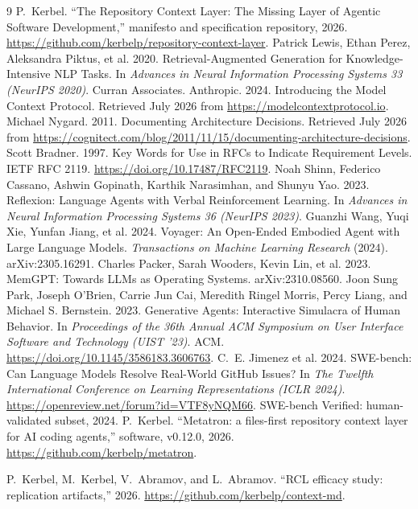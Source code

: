 \documentclass[sigconf,review]{acmart}
\newcommand{\artifact}{\url{https://github.com/kerbelp/context-md}}
\begin{document}
\begingroup\small\vspace{-2pt}
\begin{thebibliography}{9}
 P.~Kerbel. ``The Repository Context Layer: The Missing Layer of Agentic Software Development,'' manifesto and specification repository, 2026. \url{https://github.com/kerbelp/repository-context-layer}.
 Patrick Lewis, Ethan Perez, Aleksandra Piktus, et al. 2020. Retrieval-Augmented Generation for Knowledge-Intensive NLP Tasks. In \emph{Advances in Neural Information Processing Systems 33 (NeurIPS 2020)}. Curran Associates.
 Anthropic. 2024. Introducing the Model Context Protocol. Retrieved July 2026 from \url{https://modelcontextprotocol.io}.
 Michael Nygard. 2011. Documenting Architecture Decisions. Retrieved July 2026 from \url{https://cognitect.com/blog/2011/11/15/documenting-architecture-decisions}.
 Scott Bradner. 1997. Key Words for Use in RFCs to Indicate Requirement Levels. IETF RFC 2119. \url{https://doi.org/10.17487/RFC2119}.
 Noah Shinn, Federico Cassano, Ashwin Gopinath, Karthik Narasimhan, and Shunyu Yao. 2023. Reflexion: Language Agents with Verbal Reinforcement Learning. In \emph{Advances in Neural Information Processing Systems 36 (NeurIPS 2023)}.
 Guanzhi Wang, Yuqi Xie, Yunfan Jiang, et al. 2024. Voyager: An Open-Ended Embodied Agent with Large Language Models. \emph{Transactions on Machine Learning Research} (2024). arXiv:2305.16291.
 Charles Packer, Sarah Wooders, Kevin Lin, et al. 2023. MemGPT: Towards LLMs as Operating Systems. arXiv:2310.08560.
 Joon Sung Park, Joseph O'Brien, Carrie Jun Cai, Meredith Ringel Morris, Percy Liang, and Michael S. Bernstein. 2023. Generative Agents: Interactive Simulacra of Human Behavior. In \emph{Proceedings of the 36th Annual ACM Symposium on User Interface Software and Technology (UIST '23)}. ACM. \url{https://doi.org/10.1145/3586183.3606763}.
 C.~E. Jimenez et al. 2024. SWE-bench: Can Language Models Resolve Real-World GitHub Issues? In \emph{The Twelfth International Conference on Learning Representations (ICLR 2024)}. \url{https://openreview.net/forum?id=VTF8yNQM66}. SWE-bench Verified: human-validated subset, 2024.
 P.~Kerbel. ``Metatron: a files-first repository context layer for AI coding agents,'' software, v0.12.0, 2026. \url{https://github.com/kerbelp/metatron}.

 P.~Kerbel, M.~Kerbel, V.~Abramov, and L.~Abramov. ``RCL efficacy study: replication artifacts,'' 2026. \artifact.
\end{thebibliography}
\endgroup
\end{document}
